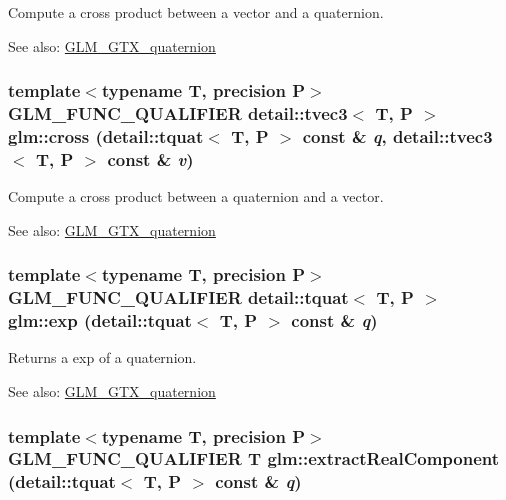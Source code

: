 Compute a cross product between a vector and a quaternion.

\begin{Desc}
\item[See also:]\hyperlink{group__gtx__quaternion}{GLM\_\-GTX\_\-quaternion} \end{Desc}
\hypertarget{group__gtx__quaternion_g968a8e63b616c369286b541a3ac96484}{
\subsubsection[cross]{\setlength{\rightskip}{0pt plus 5cm}template$<$typename T, precision P$>$ GLM\_\-FUNC\_\-QUALIFIER detail::tvec3$<$ T, P $>$ glm::cross (detail::tquat$<$ T, P $>$ const \& {\em q}, \/  detail::tvec3$<$ T, P $>$ const \& {\em v})}}
\label{group__gtx__quaternion_g968a8e63b616c369286b541a3ac96484}


Compute a cross product between a quaternion and a vector.

\begin{Desc}
\item[See also:]\hyperlink{group__gtx__quaternion}{GLM\_\-GTX\_\-quaternion} \end{Desc}
\hypertarget{group__gtx__quaternion_gd4ec8f59911f01bb4c298839017ba91f}{
\subsubsection[exp]{\setlength{\rightskip}{0pt plus 5cm}template$<$typename T, precision P$>$ GLM\_\-FUNC\_\-QUALIFIER detail::tquat$<$ T, P $>$ glm::exp (detail::tquat$<$ T, P $>$ const \& {\em q})}}
\label{group__gtx__quaternion_gd4ec8f59911f01bb4c298839017ba91f}


Returns a exp of a quaternion.

\begin{Desc}
\item[See also:]\hyperlink{group__gtx__quaternion}{GLM\_\-GTX\_\-quaternion} \end{Desc}
\hypertarget{group__gtx__quaternion_g1185beb6d3dd4bcf64ea30f5f12a7368}{
\subsubsection[extractRealComponent]{\setlength{\rightskip}{0pt plus 5cm}template$<$typename T, precision P$>$ GLM\_\-FUNC\_\-QUALIFIER T glm::extractRealComponent (detail::tquat$<$ T, P $>$ const \& {\em q})}}
\label{group__gtx__quaternion_g1185beb6d3dd4bcf64ea30f5f12a7368}


